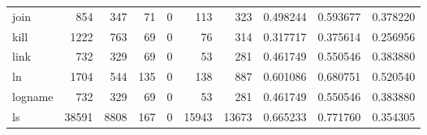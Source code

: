 \begin{longtable}{lrrrrrrrrr}
join      &                                                854 &                                                347 &                                                 71 &                                                  0 &                                                113 &                                                323 &                                           0.498244 &                               0.593677 &                             0.378220 \\
kill      &                                               1222 &                                                763 &                                                 69 &                                                  0 &                                                 76 &                                                314 &                                           0.317717 &                               0.375614 &                             0.256956 \\
link      &                                                732 &                                                329 &                                                 69 &                                                  0 &                                                 53 &                                                281 &                                           0.461749 &                               0.550546 &                             0.383880 \\
ln        &                                               1704 &                                                544 &                                                135 &                                                  0 &                                                138 &                                                887 &                                           0.601086 &                               0.680751 &                             0.520540 \\
logname   &                                                732 &                                                329 &                                                 69 &                                                  0 &                                                 53 &                                                281 &                                           0.461749 &                               0.550546 &                             0.383880 \\
ls        &                                              38591 &                                               8808 &                                                167 &                                                  0 &                                              15943 &                                              13673 &                                           0.665233 &                               0.771760 &                             0.354305 \\

\end{longtable}
